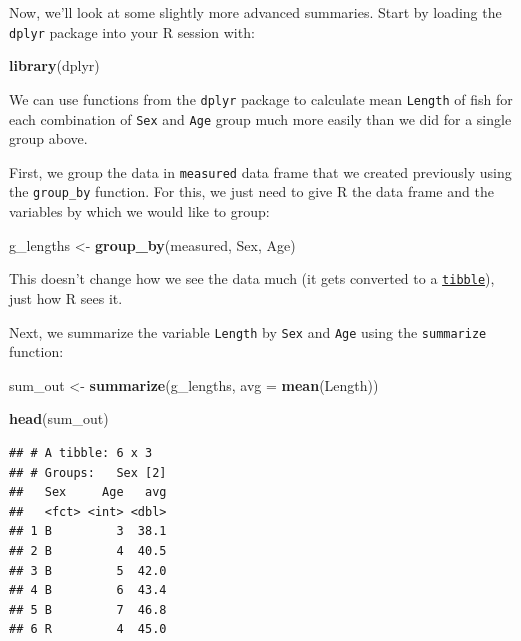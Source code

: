 \documentclass[
]{book}
\newenvironment{Shaded}{\begin{snugshade}}{\end{snugshade}}
\newcommand{\DataTypeTok}[1]{\textcolor[rgb]{0.13,0.29,0.53}{#1}}
\newcommand{\KeywordTok}[1]{\textcolor[rgb]{0.13,0.29,0.53}{\textbf{#1}}}
\newcommand{\NormalTok}[1]{#1}
\newcommand{\StringTok}[1]{\textcolor[rgb]{0.31,0.60,0.02}{#1}}
\begin{document}
Now, we'll look at some slightly more advanced summaries. Start by loading the \texttt{dplyr} package into your R session with:

\begin{Shaded}
\begin{Highlighting}[]
\KeywordTok{library}\NormalTok{(dplyr)}
\end{Highlighting}
\end{Shaded}

We can use functions from the \texttt{dplyr} package to calculate mean \texttt{Length} of fish for each combination of \texttt{Sex} and \texttt{Age} group much more easily than we did for a single group above.

First, we group the data in \texttt{measured} data frame that we created previously using the \texttt{group\_by} function. For this, we just need to give R the data frame and the variables by which we would like to group:

\begin{Shaded}
\begin{Highlighting}[]
\NormalTok{g_lengths <-}\StringTok{ }\KeywordTok{group_by}\NormalTok{(measured, Sex, Age)}
\end{Highlighting}
\end{Shaded}

This doesn't change how we see the data much (it gets converted to a \href{https://tibble.tidyverse.org/\#:~:text=A\%20tibble\%2C\%20or\%20tbl_df\%20\%2C\%20is,modern\%20reimagining\%20of\%20the\%20data.\&text=Tibbles\%20are\%20data.,a\%20variable\%20does\%20not\%20exist}{\texttt{tibble}}), just how R sees it.

Next, we summarize the variable \texttt{Length} by \texttt{Sex} and \texttt{Age} using the \texttt{summarize} function:

\begin{Shaded}
\begin{Highlighting}[]
\NormalTok{sum_out <-}\StringTok{ }\KeywordTok{summarize}\NormalTok{(g_lengths, }\DataTypeTok{avg =} \KeywordTok{mean}\NormalTok{(Length))}

\KeywordTok{head}\NormalTok{(sum_out)}
\end{Highlighting}
\end{Shaded}

\begin{verbatim}
## # A tibble: 6 x 3
## # Groups:   Sex [2]
##   Sex     Age   avg
##   <fct> <int> <dbl>
## 1 B         3  38.1
## 2 B         4  40.5
## 3 B         5  42.0
## 4 B         6  43.4
## 5 B         7  46.8
## 6 R         4  45.0
\end{verbatim}
\end{document}
